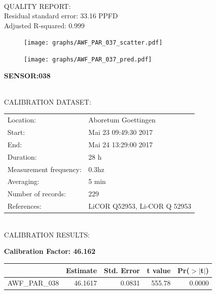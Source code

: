 \documentclass[oneside]{report}
\begin{document}
\hrulefill\\
QUALITY REPORT:\\
Residual standard error: 33.16 PPFD\\
Adjusted R-squared: 0.999



\begin{figure}[H]
  \centering
  \texttt{[image: graphs/AWF\_PAR\_037\_scatter.pdf]}
\end{figure}




\begin{figure}[H]
  \centering
  \texttt{[image: graphs/AWF\_PAR\_037\_pred.pdf]}
\end{figure}

\pagebreak


\begin{center}
\large{\textbf{SENSOR:038}}\\
\end{center}

\hrulefill\\
CALIBRATION DATASET:\\
\begin{table}[h!]
  \centering
  \label{tab:table1}
  \begin{tabular}{ll}
    Location: & Aboretum Goettingen\\ 
    
    
    Start:  & Mai 23 09:49:30 2017 \\
    End:   & Mai 24 13:29:00 2017\\ 
    Duration: & 28 h\\
    Measurement frequency: & 0.3hz\\
    Averaging:  &5 min\\
    Number of records: & 229 \\
    References: & LiCOR Q52953, Li-COR Q 52953 \\
  \end{tabular}
\end{table}

\hrulefill\\
CALIBRATION RESULTS:\\


\begin{center}
\textbf{\large{Calibration Factor: 46.162}}\\
\end{center}
\begin{table}[ht]
\centering
\begin{tabular}{rrrrr}
  \hline
 & Estimate & Std. Error & t value & Pr($>$$|$t$|$) \\ 
  \hline
AWF\_PAR\_038 & 46.1617 & 0.0831 & 555.78 & 0.0000 \\ 
   \hline
\end{tabular}
\end{table}
\end{document}
